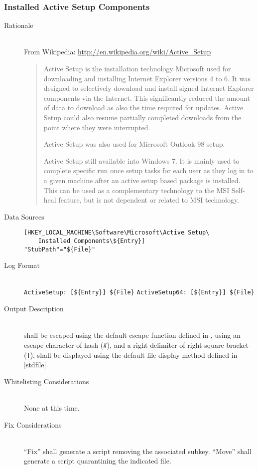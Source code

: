 \subsubsection{Installed Active Setup Components}
\begin{description}
\item[Rationale] \hfill \\
From Wikipedia:
\url{http://en.wikipedia.org/wiki/Active_Setup}

\begin{quote}
Active Setup is the installation technology Microsoft used for downloading and
installing Internet Explorer versions 4 to 6. It was designed to selectively
download and install signed Internet Explorer components via the Internet.
This significantly reduced the amount of data to download as also the time
required for updates. Active Setup could also resume partially completed
downloads from the point where they were interrupted.

Active Setup was also used for Microsoft Outlook 98 setup.

Active Setup still available into Windows 7. It is mainly used to complete
specific run once setup tasks for each user as they log in to a given
machine after an active setup based package is installed. This can be
used as a complementary technology to the MSI Self-heal feature, but is
not dependent or related to MSI technology.
\end{quote}
\item[Data Sources] \hfill
\vspace{-\baselineskip}
\begin{verbatim}
[HKEY_LOCAL_MACHINE\Software\Microsoft\Active Setup\
    Installed Components\${Entry}]
"StubPath"="${File}"
\end{verbatim}
\item[Log Format] \hfill \\
\verb|ActiveSetup: [${Entry}] ${File}|
\verb|ActiveSetup64: [${Entry}] ${File}|
\item[Output Description] \hfill \\
 shall be escaped using the default escape function defined in
\var{generalescape}, using an escape character of hash (\verb|#|), and a right
delimiter of right square bracket (\verb|]|). \var{File} shall be displayed
using the default file display method defined in \ref{stdfile}.
\item[Whitelisting Considerations] \hfill \\
None at this time.
\item[Fix Considerations] \hfill \\
``Fix'' shall generate a script removing the associated  subkey.
``Move'' shall generate a script quarantining the indicated file.
\end{description}


